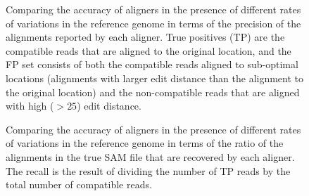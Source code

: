\begin{figure}%
    \caption[Accuracy of aligners in the presence of variations in the reference - precision]
    {Comparing the accuracy of aligners in the presence of different rates of variations in the reference genome
    in terms of the precision of the alignments reported by each aligner. 
    True positives (TP) are the compatible reads that are aligned to the original location, 
    and the FP set consists of both the compatible reads aligned to sub-optimal locations 
    (alignments with larger edit distance than the alignment to the original location) 
    and the non-compatible reads that are aligned with high ($>25$) edit distance.}
\end{figure}
\begin{figure}%
    \caption[Accuracy of aligners in the presence of variations in the reference - recall]
    {Comparing the accuracy of aligners in the presence of different rates of variations in the reference genome
    in terms of the ratio of the alignments in the true SAM file that are recovered by each aligner. 
    The recall is the result of dividing the number of TP reads by the total number of compatible reads.}
    \label{fig:DNAseq-SV}
\end{figure}

